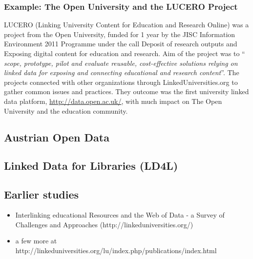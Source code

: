 \subsubsection{Example: The Open University and the LUCERO Project}
LUCERO (Linking University Content for Education and Research Online) was a project from the Open University, funded for 1 year by the JISC Information Environment 2011 Programme under the call Deposit of research outputs and Exposing digital content for education and research. Aim of the project was to "` \textit{ scope, prototype, pilot and evaluate reusable, cost-effective solutions relying on linked data for exposing and connecting educational and research content}"'.\cite{url:lucero} The projects connected with other organizations through LinkedUniversities.org to gather common issues and practices. They outcome was the first university linked data platform, \url{http://data.open.ac.uk/}, with much impact on The Open University and the education community.

\subsection{Austrian Open Data}
\subsection{Linked Data for Libraries (LD4L)\label{ld-libraries}}



\subsection{Earlier studies}
\begin{itemize}
	\item Interlinking educational Resources and the Web of Data - a Survey of Challenges and Approaches (http://linkeduniversities.org/)
	\item a few more at http://linkeduniversities.org/lu/index.php/publications/index.html
	
	
\end{itemize}